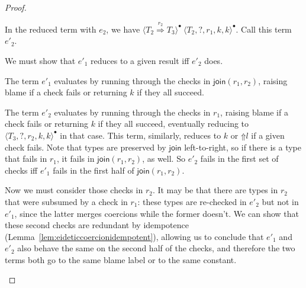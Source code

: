 \documentclass[9pt]{extarticle}
\newcommand{\ottnt}[1]{\mathit{#1}}
\begin{document}
\begin{lemma}
\begin{proof}
{\begin{itemize}
      In the reduced term with $\ottnt{e_{{\mathrm{2}}}}$, we have $ \langle  \ottnt{T_{{\mathrm{2}}}}  \mathord{ \overset{ \ottnt{r_{{\mathrm{2}}}} }{\Rightarrow} }  \ottnt{T_{{\mathrm{3}}}}  \rangle^{\bullet} ~   \langle  \ottnt{T_{{\mathrm{2}}}} ,   \mathord{?}  ,  \ottnt{r_{{\mathrm{1}}}} ,  \ottnt{k} ,  \ottnt{k}  \rangle^{\bullet}  $. Call this term $\ottnt{e'_{{\mathrm{2}}}}$.

      We must show that $\ottnt{e'_{{\mathrm{1}}}}$ reduces to a given result iff
      $\ottnt{e'_{{\mathrm{2}}}}$ does.

      The term $\ottnt{e'_{{\mathrm{1}}}}$ evaluates by running through the checks
      in $ \mathsf{join} ( \ottnt{r_{{\mathrm{1}}}} , \ottnt{r_{{\mathrm{2}}}} ) $, raising blame if a check fails or returning
      $\ottnt{k}$ if they all succeed.

      The term $\ottnt{e'_{{\mathrm{2}}}}$ evaluates by running through the checks
      in $\ottnt{r_{{\mathrm{1}}}}$, raising blame if a check fails or returning $\ottnt{k}$
      if they all succeed, eventually reducing to $ \langle  \ottnt{T_{{\mathrm{3}}}} ,   \mathord{?}  ,  \ottnt{r_{{\mathrm{2}}}} ,  \ottnt{k} ,  \ottnt{k}  \rangle^{\bullet} $
      in that case. This term, similarly, reduces to $\ottnt{k}$ or
      $ \mathord{\Uparrow}  \ottnt{l} $ if a given check fails.
Note that types are preserved by $ \mathsf{join} $ left-to-right, so if
      there is a type that fails in $\ottnt{r_{{\mathrm{1}}}}$, it fails in $ \mathsf{join} ( \ottnt{r_{{\mathrm{1}}}} , \ottnt{r_{{\mathrm{2}}}} ) $, as well. So $\ottnt{e'_{{\mathrm{2}}}}$ fails in the first set of checks
      iff $\ottnt{e'_{{\mathrm{1}}}}$ fails in the first half of $ \mathsf{join} ( \ottnt{r_{{\mathrm{1}}}} , \ottnt{r_{{\mathrm{2}}}} ) $.
      
      Now we must consider those checks in $\ottnt{r_{{\mathrm{2}}}}$. It may be that
      there are types in $\ottnt{r_{{\mathrm{2}}}}$ that were subsumed by a check in $\ottnt{r_{{\mathrm{1}}}}$:
      these types are re-checked in $\ottnt{e'_{{\mathrm{2}}}}$ but not in
      $\ottnt{e'_{{\mathrm{1}}}}$, since the latter merges coercions while the former
      doesn't. We can show that these second checks are redundant by
      idempotence (Lemma~\ref{lem:eideticcoercionidempotent}),
      allowing us to conclude that $\ottnt{e'_{{\mathrm{1}}}}$ and $\ottnt{e'_{{\mathrm{2}}}}$ also behave
      the same on the second half of the checks, and therefore the two
      terms both go to the same blame label or to the same constant.


\end{itemize}}
\end{proof}
\end{lemma}
\end{document}

